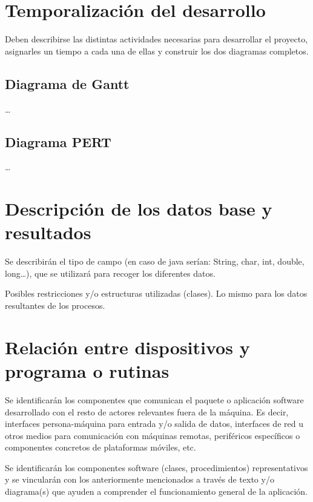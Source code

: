 \documentclass[12pt,a4paper,titlepage]{article}
\begin{document}
    \section{Temporalización del desarrollo}

    Deben describirse las distintas actividades necesarias para desarrollar el proyecto, asignarles un tiempo a cada una de ellas y construir los dos diagramas completos.

    \subsection{Diagrama de Gantt}

    \dots

    \subsection{Diagrama PERT}

    \dots

    \section{Descripción de los datos base y resultados}

    Se describirán el tipo de campo (en caso de java serían: String, char, int, double, long\dots), que se utilizará para recoger los diferentes datos.

    Posibles restricciones y/o estructuras utilizadas (clases). Lo mismo para los datos resultantes de los procesos.

    \section{Relación entre dispositivos y programa o rutinas}

    Se identificarán los componentes que comunican el paquete o aplicación software desarrollado con el resto de actores relevantes fuera de la máquina. Es decir, interfaces persona-máquina para entrada y/o salida de datos, interfaces de red u otros medios para comunicación con máquinas remotas, periféricos específicos o componentes concretos de plataformas móviles, etc.

    Se identificarán los componentes software (clases, procedimientos) representativos y se vincularán con los anteriormente mencionados a través de texto y/o diagrama(s) que ayuden a comprender el funcionamiento general de la aplicación.

    

    \newpage

    \printbibliography
    \newpage

    \lstlistoflistings
\end{document}
